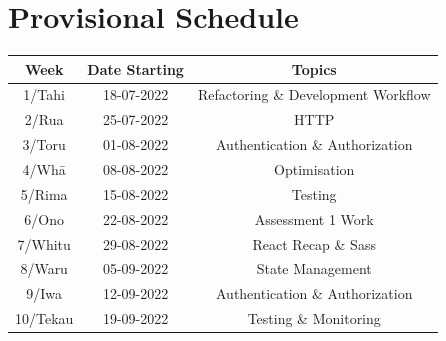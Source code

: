 \documentclass{article}
\begin{document}
\section*{Provisional Schedule}

\renewcommand{\arraystretch}{1.5}
\begin{tabular}{|c|c|c|c|}
	\hline
	\textbf{Week}                  & \textbf{Date Starting}            & \multicolumn{2}{c|}{\textbf{Topics}}                                                                                             \\ \hline
	\footnotesize 1/Tahi           & \footnotesize 18-07-2022 & \multicolumn{2}{c|}{\footnotesize Refactoring  \& Development Workflow}    \\ \hline
	\footnotesize 2/Rua            & \footnotesize 25-07-2022 & \multicolumn{2}{c|}{\footnotesize HTTP}                   \\ \hline
	\footnotesize 3/Toru           & \footnotesize 01-08-2022 & \multicolumn{2}{c|}{\footnotesize Authentication  \& Authorization} \\ \hline
	\footnotesize 4/Whā            & \footnotesize 08-08-2022 & \multicolumn{2}{c|}{\footnotesize Optimisation}                               \\ \hline
	\footnotesize 5/Rima           & \footnotesize 15-08-2022 & \multicolumn{2}{c|}{\footnotesize Testing}                                                \\ \hline
	\footnotesize 6/Ono            & \footnotesize 22-08-2022 &  \multicolumn{2}{c|}{\footnotesize Assessment 1 Work}                            \\ \hline
	\footnotesize 7/Whitu          & \footnotesize 29-08-2022 & \multicolumn{2}{c|}{\footnotesize React Recap \& Sass}                                                   \\ \hline
	\footnotesize 8/Waru           & \footnotesize 05-09-2022 & \multicolumn{2}{c|}{\footnotesize  State Management}                                                   \\ \hline
	\footnotesize 9/Iwa            & \footnotesize 12-09-2022 & \multicolumn{2}{c|}{\footnotesize Authentication  \& Authorization}                                                                 \\ \hline
	\footnotesize 10/Tekau         & \footnotesize 19-09-2022 & \multicolumn{2}{c|}{\footnotesize Testing  \& Monitoring}                                                                 \\ \hline


\end{tabular}
\end{document}
